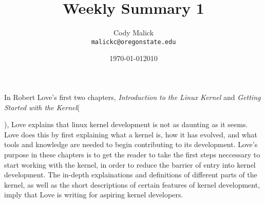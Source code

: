 \documentclass[10pt,letterpaper]{article}
\begin{document}
  \title{Weekly Summary 1}
  \author{Cody Malick\\
  \texttt{malickc@oregonstate.edu}}
  \date{\today}
  \maketitle

    In Robert Love's first two chapters, \textit{Introduction to the Linux
    Kernel} and \textit{Getting Started with the Kernel}(\date{2010}), Love
    explains that linux kernel development is not as daunting as it seems.
    Love does this by first explaining what a kernel is, how it has evolved, and
    what tools and knowledge are needed to begin contributing to its
    development. Love's purpose in these chapters is to get the reader to take
    the first steps neccessary to start working with the kernel, in order to
    reduce the barrier of entry into kernel development. The in-depth
    explainations and definitions of different parts of the kernel, as well
    as the short descriptions of certain features of kernel development, imply
    that Love is writing for aspiring kernel developers.
\end{document}
